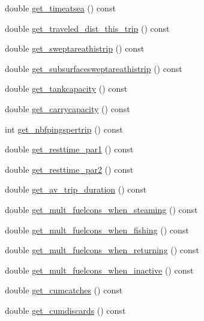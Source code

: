 \begin{DoxyCompactItemize}
\item 
double \mbox{\hyperlink{class_vessel_ad428d1a780f020a09429922d98d19a10}{get\+\_\+timeatsea}} () const
\item 
double \mbox{\hyperlink{class_vessel_a626754fafadbc4960efc582bb621522b}{get\+\_\+traveled\+\_\+dist\+\_\+this\+\_\+trip}} () const
\item 
double \mbox{\hyperlink{class_vessel_a98c90ddcbb9af91fe50e6e949fe4fc4c}{get\+\_\+sweptareathistrip}} () const
\item 
double \mbox{\hyperlink{class_vessel_a97ad69413e12ffd2999b84d9f56f0f80}{get\+\_\+subsurfacesweptareathistrip}} () const
\item 
double \mbox{\hyperlink{class_vessel_ab4bed530d5c17ad2cbd6c473a91c1812}{get\+\_\+tankcapacity}} () const
\item 
double \mbox{\hyperlink{class_vessel_ad842186a93c004b2d31434ff25f82e41}{get\+\_\+carrycapacity}} () const
\item 
int \mbox{\hyperlink{class_vessel_ac6fc5966232c30face95d8f7a5fbd9c5}{get\+\_\+nbfpingspertrip}} () const
\item 
double \mbox{\hyperlink{class_vessel_af4d21d4180cb1061e617cae7eb0f71d4}{get\+\_\+resttime\+\_\+par1}} () const
\item 
double \mbox{\hyperlink{class_vessel_a03139a9d094ed1add3bc65bb64dadefe}{get\+\_\+resttime\+\_\+par2}} () const
\item 
double \mbox{\hyperlink{class_vessel_ab046eb6fb13d2d1c223d8716b0f63cee}{get\+\_\+av\+\_\+trip\+\_\+duration}} () const
\item 
double \mbox{\hyperlink{class_vessel_aaee4c05d2d72598e429675738a771ded}{get\+\_\+mult\+\_\+fuelcons\+\_\+when\+\_\+steaming}} () const
\item 
double \mbox{\hyperlink{class_vessel_a5a0dd1a2727976a94baccc62ce0dfb21}{get\+\_\+mult\+\_\+fuelcons\+\_\+when\+\_\+fishing}} () const
\item 
double \mbox{\hyperlink{class_vessel_ab4898c7c036fad525d629b6105e95e88}{get\+\_\+mult\+\_\+fuelcons\+\_\+when\+\_\+returning}} () const
\item 
double \mbox{\hyperlink{class_vessel_ac86f09da4c2d37156d0366043ca58ebb}{get\+\_\+mult\+\_\+fuelcons\+\_\+when\+\_\+inactive}} () const
\item 
double \mbox{\hyperlink{class_vessel_a199997f3fb305ddc062d8d7aac084228}{get\+\_\+cumcatches}} () const
\item 
double \mbox{\hyperlink{class_vessel_a2f9a993276582c13cfb5d325d2fe82ef}{get\+\_\+cumdiscards}} () const

\end{DoxyCompactItemize}
